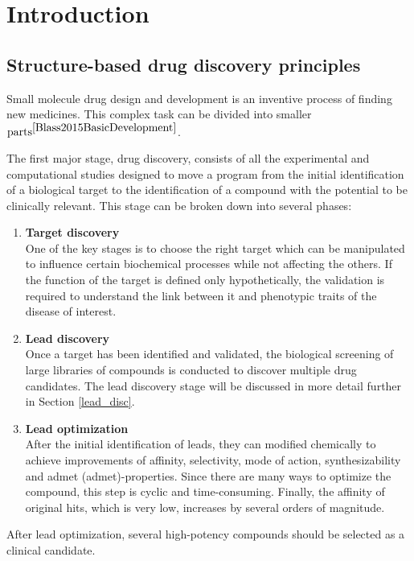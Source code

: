\chapter{Introduction}
\section{Structure-based drug discovery principles}
Small molecule drug design and development is an inventive process of finding new 
medicines.
This complex task can be divided into smaller $\text{parts}^{\cite{Blass2015BasicDevelopment}}$. 

The first major stage, drug discovery, consists of all the experimental and computational 
studies designed to move a program from the initial identification of a biological 
target to the identification of a compound with the potential to be clinically relevant.
This stage can be broken down into several phases:
\begin{enumerate}
    \item \textbf{Target discovery}\\
    One of the key stages is to choose the right target which can be manipulated 
to influence certain biochemical processes while not affecting the others.
    If the function of the target is defined only hypothetically, the validation 
is required to understand the link between it and phenotypic traits of the disease 
of interest.
    \item \textbf{Lead discovery}\\
    Once a target has been identified and validated, the biological screening of 
large libraries of compounds is conducted to discover multiple drug candidates.
    The lead discovery stage will be discussed in more detail further in Section 
\ref{lead_disc}.
    \item \textbf{Lead optimization}\\
    After the initial identification of leads, they can modified chemically to achieve 
improvements of  affinity, selectivity, mode of action, synthesizability and \acrshort{admet} 
(\acrlong{admet})-properties.
    Since there are many ways to optimize the compound, this step is cyclic and 
time-consuming. Finally, the affinity of \glqq original hits\grqq, which is very 
low, increases by several orders of magnitude.
\end{enumerate}

After lead optimization, several high-potency compounds should be selected as a 
clinical candidate.

